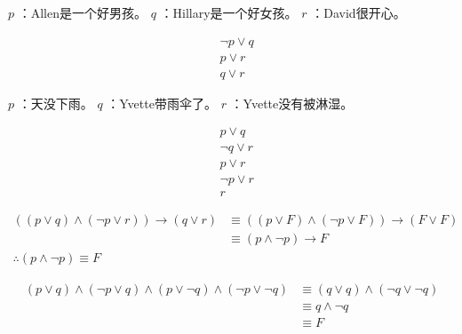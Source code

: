 {{        %
        \begin{practices}
            $p$ ：Allen是一个好男孩。
            $q$ ：Hillary是一个好女孩。
            $r$ ：David很开心。

            \begin{align*}
                &\neg p \vee q \\
                &p \vee r \\
                &q \vee r
            \end{align*}
        \end{practices}

        \begin{practices}
            $p$ ：天没下雨。
            $q$ ：Yvette带雨伞了。
            $r$ ：Yvette没有被淋湿。

            \begin{align*}
                &p \vee q \\
                &\neg q \vee r \\
                &p \vee r \\
                &\neg p \vee r \\
                &r
            \end{align*}
        \end{practices}

        \begin{practices}
            \begin{align*}
                ((p \vee q) \wedge (\neg p \vee r)) \rightarrow (q \vee r)
                &\equiv ((p \vee F) \wedge (\neg p \vee F)) \rightarrow (F \vee F) \\
                &\equiv (p \wedge \neg p) \rightarrow F \\
                \therefore (p \wedge \neg p) \equiv F
            \end{align*}
        \end{practices}

        \begin{practices}
            \begin{align*}
                (p \vee q) \wedge (\neg p \vee q) \wedge (p \vee \neg q) \wedge (\neg p \vee \neg q)
                &\equiv (q \vee q) \wedge (\neg q \vee \neg q) \\
                &\equiv q \wedge \neg q \\
                &\equiv F
            \end{align*}
        \end{practices}

}}
